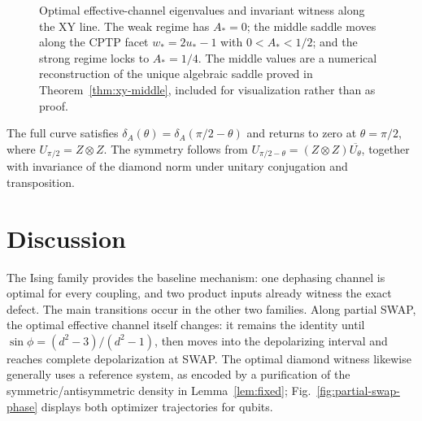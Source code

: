 \documentclass[11pt,a4paper]{article}
\theoremstyle{remark}
\begin{document}
\begin{figure}[t]
\centering
{}
\caption{Optimal effective-channel eigenvalues and invariant witness along the
XY line.  The weak regime has $A_*=0$; the middle saddle moves along the CPTP
facet $w_*=2u_*-1$ with $0<A_*<1/2$; and the strong regime locks to
$A_*=1/4$.  The middle values are a numerical reconstruction of the unique
algebraic saddle proved in Theorem~\ref{thm:xy-middle}, included for
visualization rather than as proof.}
\label{fig:xy-phase}
\end{figure}

The full curve satisfies
$\delta_A(\theta)=\delta_A(\pi/2-\theta)$ and returns to zero at
$\theta=\pi/2$, where $U_{\pi/2}=Z\otimes Z$.  The symmetry follows from
$U_{\pi/2-\theta}=(Z\otimes Z)\overline{U_\theta}$, together with invariance
of the diamond norm under unitary conjugation and transposition.

\section{Discussion}

The Ising family provides the baseline mechanism: one dephasing channel is
optimal for every coupling, and two product inputs already witness the exact
defect.  The main transitions occur in the other two families.  Along partial
SWAP, the optimal effective channel itself changes: it remains the identity until
$\sin\phi=(d^2-3)/(d^2-1)$, then moves into the depolarizing interval and
reaches complete depolarization at SWAP.  The optimal diamond witness likewise
generally uses a reference system, as encoded by a purification of the
symmetric/antisymmetric density in
Lemma~\ref{lem:fixed}; Fig.~\ref{fig:partial-swap-phase} displays both
optimizer trajectories for qubits.
\end{document}
